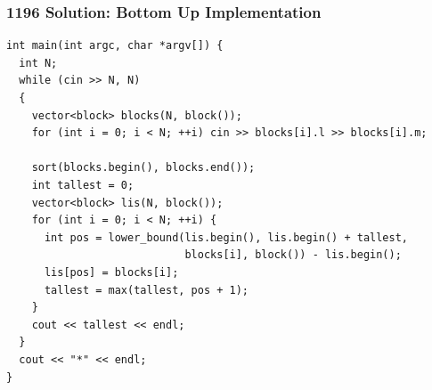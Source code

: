 \documentclass{beamer}
\begin{document}
\begin{frame}[containsverbatim]
\frametitle{1196 Solution: Bottom Up Implementation}

\scriptsize
\begin{lstlisting}
int main(int argc, char *argv[]) {
  int N;
  while (cin >> N, N)
  {
    vector<block> blocks(N, block());
    for (int i = 0; i < N; ++i) cin >> blocks[i].l >> blocks[i].m;

    sort(blocks.begin(), blocks.end());
    int tallest = 0;
    vector<block> lis(N, block());
    for (int i = 0; i < N; ++i) {
      int pos = lower_bound(lis.begin(), lis.begin() + tallest,
                            blocks[i], block()) - lis.begin();
      lis[pos] = blocks[i];
      tallest = max(tallest, pos + 1);
    }
    cout << tallest << endl;
  }
  cout << "*" << endl;
}
\end{lstlisting}

\end{frame}
\end{document}

